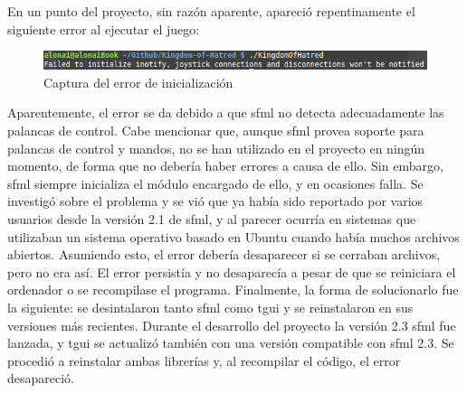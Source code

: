 	En un punto del proyecto, sin razón aparente, apareció repentinamente el siguiente error al ejecutar el juego:

	\begin{figure}[!htp]
		 \centering
		 \includegraphics[scale=.5]{fig/inotify}
		 \caption{Captura del error de inicialización}
		 \label{fig:inotify}
	\end{figure}

	Aparentemente, el error se da debido a que \acrshort{sfml} no detecta adecuadamente las palancas de control. Cabe mencionar que, aunque \acrshort{sfml} provea soporte para palancas de control y mandos, no se han utilizado en el proyecto en ningún momento, de forma que no debería haber errores a causa de ello. Sin embargo, \acrshort{sfml} siempre inicializa el módulo encargado de ello, y en ocasiones falla. Se investigó sobre el problema y se vió que ya había sido reportado por varios usuarios desde la versión 2.1 de \acrshort{sfml}, y al parecer ocurría en sistemas que utilizaban un sistema operativo basado en Ubuntu cuando había muchos archivos abiertos. Asumiendo esto, el error debería desaparecer si se cerraban archivos, pero no era así. El error persistía y no desaparecía a pesar de que se reiniciara el ordenador o se recompilase el programa. Finalmente, la forma de solucionarlo fue la siguiente: se desintalaron tanto \acrshort{sfml} como \acrshort{tgui} y se reinstalaron en sus versiones más recientes. Durante el desarrollo del proyecto la versión 2.3 \acrshort{sfml} fue lanzada, y \acrshort{tgui} se actualizó también con una versión compatible con \acrshort{sfml} 2.3. Se procedió a reinstalar ambas librerías y, al recompilar el código, el error desapareció.

